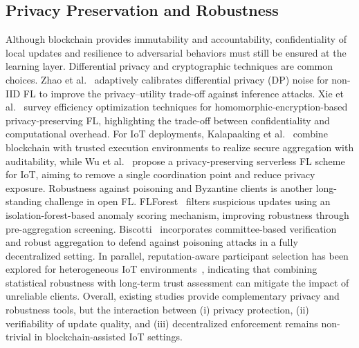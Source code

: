 \documentclass[a4paper]{cas-dc}
\begin{document}
\subsection{Privacy Preservation and Robustness}
Although blockchain provides immutability and accountability, confidentiality of local updates and
resilience to adversarial behaviors must still be ensured at the learning layer. Differential privacy
and cryptographic techniques are common choices. Zhao et al.~\cite{12} adaptively calibrates differential
privacy (DP) noise for non-IID FL to improve the privacy--utility trade-off against inference attacks.
Xie et al.~\cite{16} survey efficiency optimization techniques
for homomorphic-encryption-based privacy-preserving FL,
highlighting the trade-off between confidentiality and
computational overhead. For IoT
deployments, Kalapaaking et al.~\cite{36} combine blockchain with trusted execution environments to
realize secure aggregation with auditability, while Wu et al.~\cite{65} propose a privacy-preserving
serverless FL scheme for IoT, aiming to remove a single coordination point and reduce privacy
exposure.
Robustness against poisoning and Byzantine clients is another long-standing challenge in open FL.
FLForest~\cite{40} filters suspicious updates using an isolation-forest-based anomaly scoring
mechanism, improving robustness through pre-aggregation screening. Biscotti~\cite{66} incorporates
committee-based verification and robust aggregation to defend against poisoning attacks in a fully
decentralized setting. In parallel, reputation-aware participant selection has been explored for
heterogeneous IoT environments~\cite{21,64}, indicating that combining statistical robustness with
long-term trust assessment can mitigate the impact of unreliable clients. Overall, existing studies
provide complementary privacy and robustness tools, but the interaction between (i) privacy
protection, (ii) verifiability of update quality, and (iii) decentralized enforcement remains
non-trivial in blockchain-assisted IoT settings.
\end{document}
